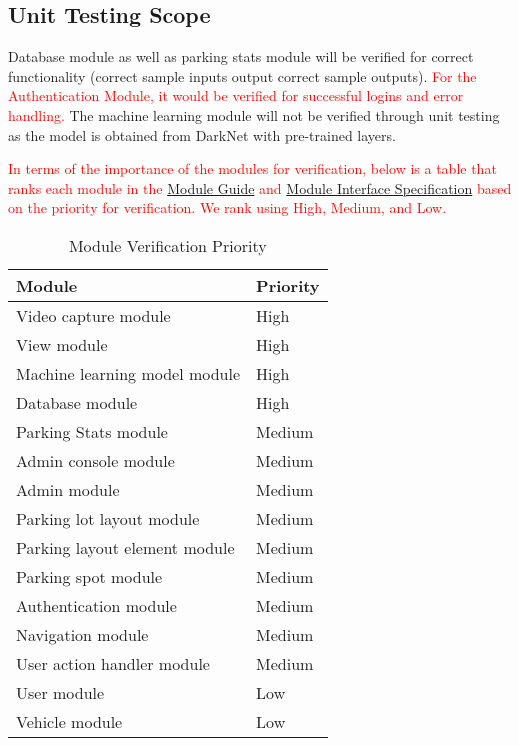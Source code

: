 \documentclass[12pt, titlepage]{article}
\begin{document}
\subsection{Unit Testing Scope}

Database module as well as parking stats module will be verified for correct
functionality (correct sample inputs output correct sample outputs).
\textcolor{red}{For the Authentication Module, it would be verified for
successful logins and error handling.} The machine learning module will not be
verified through unit testing as the model is obtained from DarkNet with
pre-trained layers.

\textcolor{red}{In terms of the importance of the modules for verification,
below is a table that ranks each module in the
\href{https://github.com/parkd-app/park-d/blob/main/docs/Design/SoftArchitecture/MG.pdf}{Module
Guide} and
\href{https://github.com/parkd-app/park-d/blob/main/docs/Design/SoftDetailedDes/MIS.pdf}{Module
Interface Specification} based on the priority for verification. We rank using
High, Medium, and Low.}

\begin{table}[H] 
    \centering
    \begin{tabularx}{\textwidth}{|X|X|}
        \toprule
        \textbf{Module} & \textbf{Priority}\\
        \midrule
        Video capture module & High\\
        View module & High\\
        Machine learning model module & High\\
        Database module & High\\
        Parking Stats module & Medium\\
        Admin console module & Medium\\
        Admin module &  Medium\\
        Parking lot layout module & Medium\\
        Parking layout element module & Medium\\
        Parking spot module & Medium\\
        Authentication module & Medium\\
        Navigation module & Medium\\
        User action handler module & Medium\\
        User module & Low\\
        Vehicle module & Low\\
        \bottomrule
    \end{tabularx}
\caption{Module Verification Priority} \label{tab:moduleVerificationPriority}
\end{table}
\end{document}
